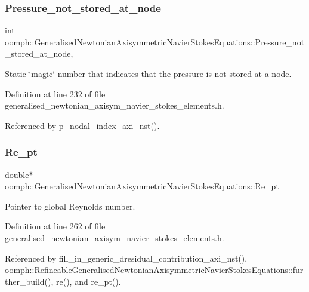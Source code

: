 \subsubsection{\texorpdfstring{Pressure\+\_\+not\+\_\+stored\+\_\+at\+\_\+node}{Pressure\_not\_stored\_at\_node}}
{\footnotesize\ttfamily int oomph\+::\+Generalised\+Newtonian\+Axisymmetric\+Navier\+Stokes\+Equations\+::\+Pressure\+\_\+not\+\_\+stored\+\_\+at\+\_\+node\hspace{0.3cm}{\ttfamily [static]}, {\ttfamily [private]}}



Static \char`\"{}magic\char`\"{} number that indicates that the pressure is not stored at a node. 



Definition at line 232 of file generalised\+\_\+newtonian\+\_\+axisym\+\_\+navier\+\_\+stokes\+\_\+elements.\+h.



Referenced by p\+\_\+nodal\+\_\+index\+\_\+axi\+\_\+nst().

\mbox{\label{classoomph_1_1GeneralisedNewtonianAxisymmetricNavierStokesEquations_a6eb3ebbbe20eb4eaa873b31642e137db}} 
\subsubsection{\texorpdfstring{Re\+\_\+pt}{Re\_pt}}
{\footnotesize\ttfamily double$\ast$ oomph\+::\+Generalised\+Newtonian\+Axisymmetric\+Navier\+Stokes\+Equations\+::\+Re\+\_\+pt\hspace{0.3cm}{\ttfamily [protected]}}



Pointer to global Reynolds number. 



Definition at line 262 of file generalised\+\_\+newtonian\+\_\+axisym\+\_\+navier\+\_\+stokes\+\_\+elements.\+h.



Referenced by fill\+\_\+in\+\_\+generic\+\_\+dresidual\+\_\+contribution\+\_\+axi\+\_\+nst(), oomph\+::\+Refineable\+Generalised\+Newtonian\+Axisymmetric\+Navier\+Stokes\+Equations\+::further\+\_\+build(), re(), and re\+\_\+pt().

